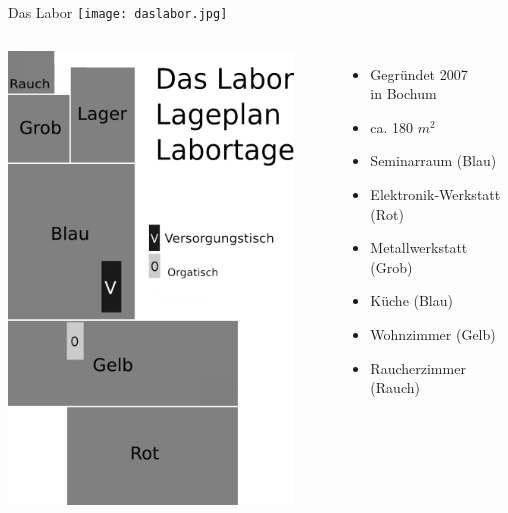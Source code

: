 \documentclass{beamer}
\begin{document}
  \begin{frame}{Das Labor}
    \texttt{[image: daslabor.jpg]}
  \end{frame}

  \begin{frame}
    \begin{columns}[l]
      \includegraphics[width=0.9\textwidth]{daslabor-map.png}
      \begin{itemize}
        \item Gegründet 2007\\in Bochum
        \item ca. 180 $m^2$
        \item Seminarraum (Blau)
        \item Elektronik-Werkstatt (Rot)
        \item Metallwerkstatt (Grob)
        \item Küche (Blau)
        \item Wohnzimmer (Gelb)
        \item Raucherzimmer (Rauch)
      \end{itemize}
    \end{columns}
  \end{frame}
\end{document}
